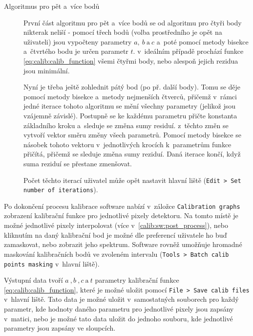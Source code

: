 \begin{description}
	\item[Algoritmus pro pět a~více bodů]
	První část algoritmu pro pět a~více bodů se od algoritmu pro čtyři body nikterak neliší - pomocí třech bodů (volba prostředního je opět na uživateli) jsou vypočteny parametry $a,~b~\text{a}~c$ a~poté pomocí metody bisekce a~čtvrtého bodu je určen parametr $t$. v~ideálním případě prochází funkce \ref{eq:calib:calib_function} všemi čtyřmi body, nebo alespoň jejich rezidua jsou minimální. 

	Nyní je třeba ještě zohlednit pátý bod (po př. další body). Tomu se děje pomocí metody bisekce a~metody nejmenších čtverců, přičemž v~rámci jedné iterace tohoto algoritmu se mění všechny parametry (jelikož jsou vzájemně závislé). Postupně se ke každému parametru přičte konstanta základního kroku a~sleduje se změna sumy residuí. z~těchto změn se vytvoří vektor směru změny všech parametrů. Pomocí metody bisekce se násobek tohoto vektoru v~jednotlivých krocích k~parametrům funkce přičítá, přičemž se sleduje změna sumy reziduí. Daná iterace končí, když suma reziduí se přestane zmenšovat.

	Počet těchto iterací uživatel může opět nastavit hlavní liště (\texttt{Edit > Set number of iterations}).

\end{description}

Po dokončení procesu kalibrace software nabízí v~záložce \texttt{Calibration graphs} zobrazení kalibrační funkce pro jednotlivé pixely detektoru. Na tomto místě je možné jednotlivé pixely interpolovat (více v~\ref{calib:sw:post_process}), nebo kliknutím na daný kalibrační bod je možné dle preferencí uživatele ho buď zamaskovat, nebo zobrazit jeho spektrum. Software rovněž umožňuje hromadné maskování kalibračních bodů ve zvoleném intervalu (\texttt{Tools > Batch calib points masking} v~hlavní liště).

Výstupní data tvoří $a~,b~,c~\text{a}~t$ parametry kalibrační funkce \ref{eq:calib:calib_function}, které je možné uložit pomocí \texttt{File > Save calib files} v~hlavní liště. Tato data je možné uložit v~samostatných souborech pro každý parametr, kde hodnoty daného parametru pro jednotlivé pixely jsou zapsány v~matici, nebo je možné tato data uložit do jednoho souboru, kde jednotlivé parametry jsou zapsány ve sloupcích.


